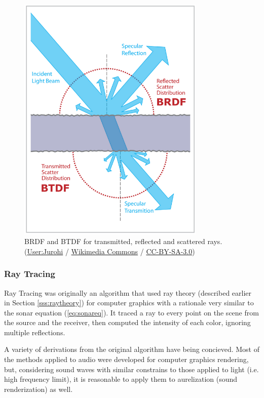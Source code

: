 \begin{figure}
	\centering
	\includegraphics[width=0.8\textwidth]{Chap2/fig/BRDF_BTDF}
	\caption{BRDF and BTDF for transmitted, reflected and scattered rays.
	(\textcopyright  \href{http://commons.wikimedia.org/wiki/User:Jurohi}{User:Jurohi} /
	\href{http://commons.wikimedia.org/}{Wikimedia Commons} /
	\href{http://creativecommons.org/licenses/by-sa/3.0/}{CC-BY-SA-3.0})}
	\label{fig:brdfbtdf}
\end{figure}




\subsubsection{Ray Tracing}

Ray Tracing was originally an algorithm that used ray theory
(described earlier in Section \ref{sss:raytheory}) for computer graphics with a
rationale very similar to the sonar equation (\ref{eq:sonareq}). It traced a ray to every point on the scene
from the source and the receiver, then computed the intensity of each color,
ignoring multiple reflections. 

A variety of derivations from the original algorithm have being concieved. Most
of the methods applied to audio were developed for computer graphics
rendering, but, considering sound waves with similar constrains to those
applied to light (i.e. high frequency limit), it is reasonable to apply them to
aurelization (sound renderization) as well.


